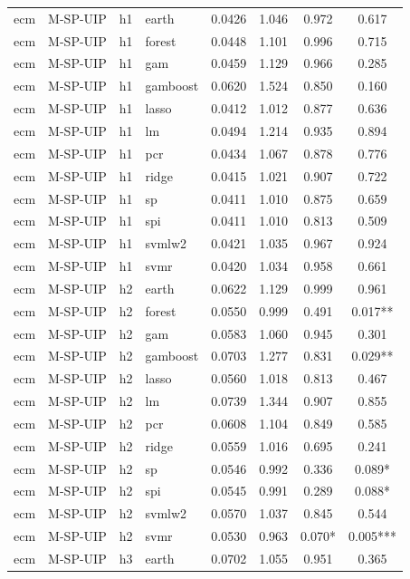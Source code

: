 \begin{ThreePartTable}
\begin{longtable}[t]{llclcccc}
\addlinespace
ecm & M-SP-UIP & h1 & earth & 0.0426 & 1.046 & 0.972 & 0.617\\
ecm & M-SP-UIP & h1 & forest & 0.0448 & 1.101 & 0.996 & 0.715\\
ecm & M-SP-UIP & h1 & gam & 0.0459 & 1.129 & 0.966 & 0.285\\
ecm & M-SP-UIP & h1 & gamboost & 0.0620 & 1.524 & 0.850 & 0.160\\
ecm & M-SP-UIP & h1 & lasso & 0.0412 & 1.012 & 0.877 & 0.636\\
ecm & M-SP-UIP & h1 & lm & 0.0494 & 1.214 & 0.935 & 0.894\\
ecm & M-SP-UIP & h1 & pcr & 0.0434 & 1.067 & 0.878 & 0.776\\
ecm & M-SP-UIP & h1 & ridge & 0.0415 & 1.021 & 0.907 & 0.722\\
ecm & M-SP-UIP & h1 & sp & 0.0411 & 1.010 & 0.875 & 0.659\\
ecm & M-SP-UIP & h1 & spi & 0.0411 & 1.010 & 0.813 & 0.509\\
ecm & M-SP-UIP & h1 & svmlw2 & 0.0421 & 1.035 & 0.967 & 0.924\\
ecm & M-SP-UIP & h1 & svmr & 0.0420 & 1.034 & 0.958 & 0.661\\
\addlinespace
ecm & M-SP-UIP & h2 & earth & 0.0622 & 1.129 & 0.999 & 0.961\\
ecm & M-SP-UIP & h2 & forest & 0.0550 & 0.999 & 0.491 & 0.017**\\
ecm & M-SP-UIP & h2 & gam & 0.0583 & 1.060 & 0.945 & 0.301\\
ecm & M-SP-UIP & h2 & gamboost & 0.0703 & 1.277 & 0.831 & 0.029**\\
ecm & M-SP-UIP & h2 & lasso & 0.0560 & 1.018 & 0.813 & 0.467\\
ecm & M-SP-UIP & h2 & lm & 0.0739 & 1.344 & 0.907 & 0.855\\
ecm & M-SP-UIP & h2 & pcr & 0.0608 & 1.104 & 0.849 & 0.585\\
ecm & M-SP-UIP & h2 & ridge & 0.0559 & 1.016 & 0.695 & 0.241\\
ecm & M-SP-UIP & h2 & sp & 0.0546 & 0.992 & 0.336 & 0.089*\\
ecm & M-SP-UIP & h2 & spi & 0.0545 & 0.991 & 0.289 & 0.088*\\
ecm & M-SP-UIP & h2 & svmlw2 & 0.0570 & 1.037 & 0.845 & 0.544\\
ecm & M-SP-UIP & h2 & svmr & 0.0530 & 0.963 & 0.070* & 0.005***\\
\addlinespace
ecm & M-SP-UIP & h3 & earth & 0.0702 & 1.055 & 0.951 & 0.365\\

\end{longtable}
\end{ThreePartTable}
